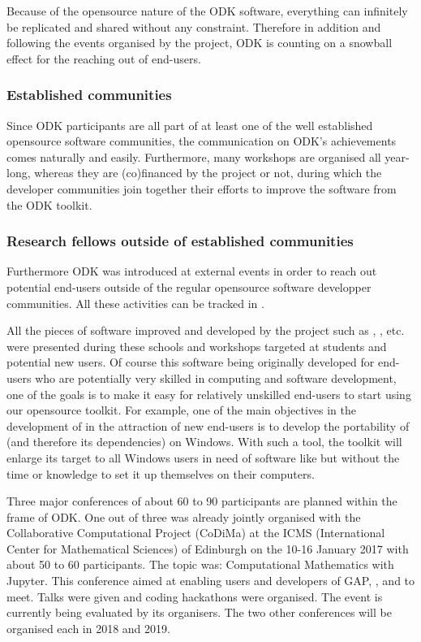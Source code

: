 \documentclass{deliverablereport}
\begin{document}
Because of the opensource nature of the ODK software, everything can infinitely be replicated and shared without any constraint. Therefore in addition and following the events organised by the project, ODK is counting on a snowball effect for the reaching out of end-users.

\subsubsection{Established communities}

Since ODK participants are all part of at least one of the well established opensource software communities, the communication on ODK's achievements comes naturally and easily. Furthermore, many workshops are organised all year-long, whereas they are (co)financed by the project or not, during which the developer communities join together their efforts to improve the software from the ODK toolkit. 

\subsubsection{Research fellows outside of established communities}

Furthermore ODK was introduced at external events in order to reach out potential end-users outside of the regular opensource software developper communities.
All these activities can be tracked in . 


All the pieces of software improved and developed by the project such as \Sage, \Singular, etc. were presented during these schools and workshops targeted at students and potential new users. Of course this software being originally developed for end-users who are potentially very skilled in computing and software development, one of the goals is to make it easy  for relatively unskilled end-users to start using our opensource toolkit. 
For example, one of the main objectives in the development of \Sage in the attraction of new end-users is to develop the portability of \Sage (and therefore its dependencies) on Windows. With such a tool, the toolkit will enlarge its target to all Windows users in need of software like \Sage but without the time or knowledge to set it up themselves on their computers.

Three major conferences of about 60 to 90 participants are planned within the frame of ODK. One out of three was already jointly organised with the Collaborative Computational Project (CoDiMa) at the ICMS (International Center for Mathematical Sciences) of Edinburgh on the 10-16 January 2017 with about 50 to 60 participants. The topic was: Computational Mathematics with Jupyter. This conference aimed at enabling users and developers of GAP, \Singular, \Sage and \Jupyter to meet. Talks were given and coding hackathons were organised. The event is currently being evaluated by its organisers. 
The two other conferences will be organised each in 2018 and 2019.

\end{document}
